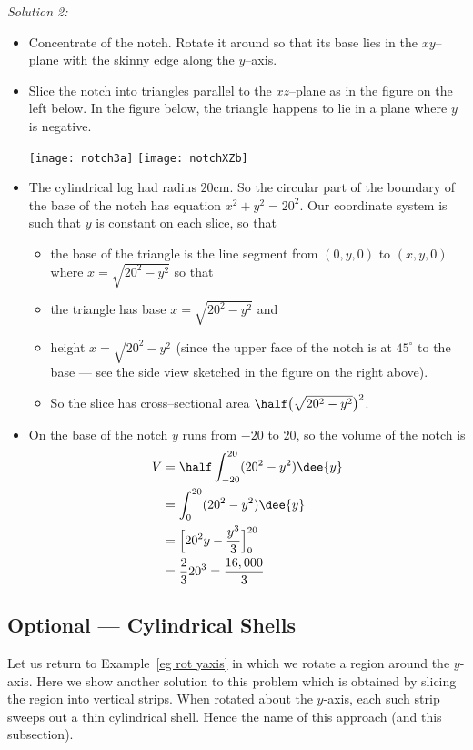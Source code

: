 \begin{eg}[Notch]
\noindent\emph{Solution 2:}\\
\begin{itemize}
 \item  Concentrate of the notch. Rotate it around so that its base
lies in the $xy$--plane with the skinny edge along the $y$--axis.
\item Slice the notch into triangles parallel to the $xz$--plane as in the figure
on the left below. In the figure below, the triangle happens to lie in a plane
where $y$ is negative.
\begin{efig}
\begin{center}
   \texttt{[image: notch3a]}\qquad
   \texttt{[image: notchXZb]}
\end{center}

\end{efig}
\item The cylindrical log had radius $20$cm. So the circular part of the boundary of the
base of the notch has equation $x^2+y^2=20^2$. Our coordinate system is such that $y$ is
constant on each slice, so that
\begin{itemize}
\item
the base of the triangle is the line segment from $(0,y,0)$ to $(x,y,0)$ where
$x=\sqrt{20^2-y^2}$ so that
\item
the triangle has base $x=\sqrt{20^2-y^2}$  and
\item
height $x=\sqrt{20^2-y^2}$ (since the upper face of the notch is at
$45^\circ$ to the base --- see the side view sketched in the figure
on the right above).
\item
So the slice has cross--sectional area $\half\big(\sqrt{20^2-y^2}\big)^2$.
\end{itemize}
\item On the base of the notch $y$ runs from $-20$ to $20$,
so the volume of the notch is
\begin{align*}
V&=\half\int_{-20}^{20}(20^2-y^2)\dee{y}\\
&=\int_0^{20} (20^2-y^2)\dee{y}\\
&=\Big[20^2y-\frac{y^3}{3}\Big]_0^{20} \\
&=\frac{2}{3}20^3=\frac{16,000}{3}
\end{align*}
\end{itemize}
\end{eg}


\subsection*{Optional --- Cylindrical Shells}
Let us return to Example~\ref{eg rot yaxis} in which we rotate a region around the
$y$-axis. Here we show another solution to this problem which is obtained by slicing the
region into vertical strips. When rotated about the $y$-axis, each such strip sweeps out
a thin cylindrical shell. Hence the name of this approach (and this subsection).


